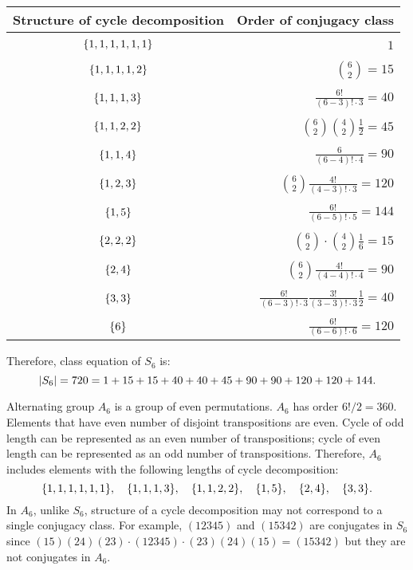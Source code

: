 \documentclass{article}
\theoremstyle{definition}
\DeclarePairedDelimiter\set{\{}{\}}
\DeclarePairedDelimiter\abs{\lvert}{\rvert}
\begin{document}
\begin{center}
    \begin{tabular}{ c | r }
        Structure of cycle decomposition & Order of conjugacy class \\
        \hline
        \\
        $\set{1,1,1,1,1,1}$ & $1$ \\\\
        $\set{1,1,1,1,2}$ & $\binom{6}{2} = 15$ \\\\
        $\set{1,1,1,3}$ & $\frac{6!}{(6-3)! \cdot 3} = 40$ \\\\
        $\set{1,1,2,2}$ & $\binom{6}{2} \binom{4}{2} \frac{1}{2} = 45$ \\\\
        $\set{1,1,4}$ & $\frac{6}{(6-4)! \cdot 4} = 90$ \\\\
        $\set{1,2,3}$ & $\binom{6}{2} \frac{4!}{(4-3)! \cdot 3} = 120$ \\\\
        $\set{1,5}$ & $\frac{6!}{(6-5)! \cdot 5} = 144$ \\\\
        $\set{2,2,2}$ & $\binom{6}{2} \cdot \binom{4}{2} \frac{1}{6} = 15$ \\\\
        $\set{2,4}$ & $\binom{6}{2} \frac{4!}{(4-4)! \cdot 4} = 90$ \\\\
        $\set{3,3}$ & $\frac{6!}{(6-3)! \cdot 3} \frac{3!}{(3-3)! \cdot 3} \frac{1}{2} = 40$ \\\\
        $\set{6}$ & $\frac{6!}{(6-6)! \cdot 6} = 120$ \\
     \end{tabular}
\end{center}
Therefore, class equation of $S_6$ is:
\[ \abs{S_6} = 720 = 1+15+15+40+40+45+90+90+120+120+144. \]

Alternating group $A_6$ is a group of even permutations.
$A_6$ has order $6!/2 = 360$.
Elements that have even number of disjoint transpositions are even.
Cycle of odd length can be represented as an even number of transpositions; cycle of even length can be represented as an odd number of transpositions.
Therefore, $A_6$ includes elements with the following lengths of cycle decomposition:
\[
    \set{1,1,1,1,1,1}, \quad
    \set{1,1,1,3}, \quad 
    \set{1,1,2,2}, \quad
    \set{1,5}, \quad 
    \set{2,4}, \quad
    \set{3,3}. 
\]
In $A_6$, unlike $S_6$, structure of a cycle decomposition may not correspond to a single conjugacy class.
For example, $(12345)$ and $(15342)$ are conjugates in $S_6$ since $(15)(24)(23) \cdot (12345) \cdot (23)(24)(15) = (15342)$ but they are not conjugates in $A_6$.
\end{document}
